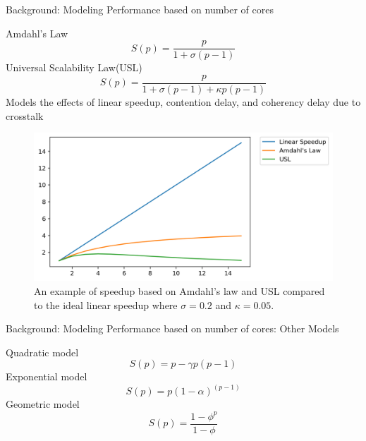 \documentclass[10pt]{beamer}
\begin{document}
\begin{frame}{Background: Modeling Performance based on number of cores}
	\begin{outline}
		\1Amdahl's Law
			$$S(p) = \frac{p}{1+\sigma(p-1)}$$
		\1Universal Scalability Law(USL)
		$$S(p) = \frac{p}{1+\sigma(p-1)+\kappa{p}(p-1)}$$
		\2 Models the effects
		of linear speedup, contention delay, and coherency delay due to crosstalk
		\begin{figure}[H]
			\centering
			\includegraphics[scale=0.38]{images/USL.png}
			\caption{An example of speedup based on Amdahl's law and USL compared to the ideal linear speedup where $\sigma=0.2$ and $\kappa=0.05$.}	
			\label{fig_Amdahl}
		\end{figure}
		

	\end{outline}
\end{frame}

\begin{frame}{Background: Modeling Performance based on number of cores: Other Models}
	\begin{outline}
		\1Quadratic model
		$$ S(p) = p-\gamma{p(p-1)}$$
		\1Exponential model
		$$S(p) = p(1-\alpha)^{(p-1)}$$
		\1Geometric model
		$$S(p) = \frac{1-\phi^{p}}{1-\phi}$$
	\end{outline}
\end{frame}



\end{document}

